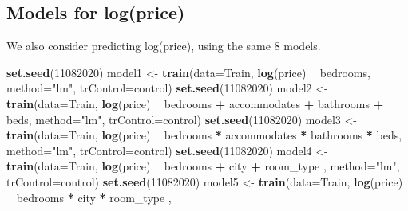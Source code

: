 \documentclass[]{book}
\newenvironment{Shaded}{\begin{snugshade}}{\end{snugshade}}
\newcommand{\KeywordTok}[1]{\textcolor[rgb]{0.13,0.29,0.53}{\textbf{#1}}}
\newcommand{\DataTypeTok}[1]{\textcolor[rgb]{0.13,0.29,0.53}{#1}}
\newcommand{\DecValTok}[1]{\textcolor[rgb]{0.00,0.00,0.81}{#1}}
\newcommand{\StringTok}[1]{\textcolor[rgb]{0.31,0.60,0.02}{#1}}
\newcommand{\OperatorTok}[1]{\textcolor[rgb]{0.81,0.36,0.00}{\textbf{#1}}}
\newcommand{\NormalTok}[1]{#1}
\begin{document}
\subsection{Models for log(price)}\label{models-for-logprice}

We also consider predicting log(price), using the same 8 models.

\begin{Shaded}
\begin{Highlighting}[]
\KeywordTok{set.seed}\NormalTok{(}\DecValTok{11082020}\NormalTok{)}
\NormalTok{model1 <-}\StringTok{ }\KeywordTok{train}\NormalTok{(}\DataTypeTok{data=}\NormalTok{Train, }\KeywordTok{log}\NormalTok{(price) }\OperatorTok{~}\StringTok{ }\NormalTok{bedrooms,  }\DataTypeTok{method=}\StringTok{"lm"}\NormalTok{, }\DataTypeTok{trControl=}\NormalTok{control)}
\KeywordTok{set.seed}\NormalTok{(}\DecValTok{11082020}\NormalTok{)}
\NormalTok{model2 <-}\StringTok{ }\KeywordTok{train}\NormalTok{(}\DataTypeTok{data=}\NormalTok{Train, }\KeywordTok{log}\NormalTok{(price) }\OperatorTok{~}\StringTok{ }\NormalTok{bedrooms }\OperatorTok{+}\StringTok{ }\NormalTok{accommodates }\OperatorTok{+}\StringTok{ }\NormalTok{bathrooms }\OperatorTok{+}\StringTok{ }\NormalTok{beds,  }
                \DataTypeTok{method=}\StringTok{"lm"}\NormalTok{, }\DataTypeTok{trControl=}\NormalTok{control)}
\KeywordTok{set.seed}\NormalTok{(}\DecValTok{11082020}\NormalTok{)}
\NormalTok{model3 <-}\StringTok{ }\KeywordTok{train}\NormalTok{(}\DataTypeTok{data=}\NormalTok{Train, }\KeywordTok{log}\NormalTok{(price) }\OperatorTok{~}\StringTok{ }\NormalTok{bedrooms }\OperatorTok{*}\StringTok{ }\NormalTok{accommodates }\OperatorTok{*}\StringTok{ }\NormalTok{bathrooms }\OperatorTok{*}\StringTok{ }\NormalTok{beds,  }
                \DataTypeTok{method=}\StringTok{"lm"}\NormalTok{, }\DataTypeTok{trControl=}\NormalTok{control)}
\KeywordTok{set.seed}\NormalTok{(}\DecValTok{11082020}\NormalTok{)}
\NormalTok{model4 <-}\StringTok{ }\KeywordTok{train}\NormalTok{(}\DataTypeTok{data=}\NormalTok{Train, }\KeywordTok{log}\NormalTok{(price) }\OperatorTok{~}\StringTok{ }\NormalTok{bedrooms }\OperatorTok{+}\StringTok{ }\NormalTok{city }\OperatorTok{+}\StringTok{ }\NormalTok{room_type ,  }
                \DataTypeTok{method=}\StringTok{"lm"}\NormalTok{, }\DataTypeTok{trControl=}\NormalTok{control)}
\KeywordTok{set.seed}\NormalTok{(}\DecValTok{11082020}\NormalTok{)}
\NormalTok{model5 <-}\StringTok{ }\KeywordTok{train}\NormalTok{(}\DataTypeTok{data=}\NormalTok{Train, }\KeywordTok{log}\NormalTok{(price) }\OperatorTok{~}\StringTok{ }\NormalTok{bedrooms }\OperatorTok{*}\StringTok{ }\NormalTok{city }\OperatorTok{*}\StringTok{ }\NormalTok{room_type ,  }

\end{Highlighting}
\end{Shaded}
\end{document}
